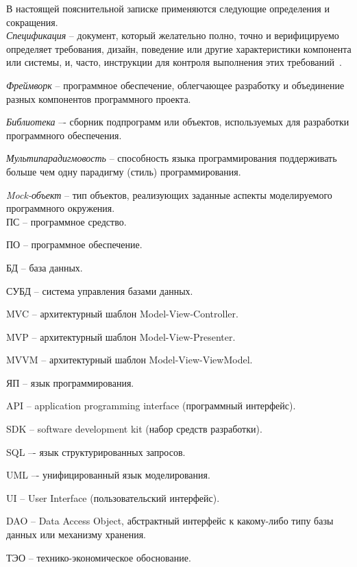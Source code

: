 \label{sec:definitions}

В настоящей пояснительной записке применяются следующие определения и сокращения.
\\

\emph{Спецификация} -- документ, который желательно полно, точно и верифицируемо определяет требования, дизайн, поведение или другие характеристики компонента или системы, и, часто, инструкции для контроля выполнения этих требований~\cite{istqb_specification}.

\emph{Фреймворк} -- программное обеспечение, облегчающее разработку и объединение разных компонентов программного проекта.

\emph{Библиотека} –- сборник подпрограмм или объектов, используемых для разработки программного обеспечения.

\emph{Мультипарадигмовость} -- способность языка программирования поддерживать больше чем одну парадигму (стиль) программирования.

\emph{Mock-объект} -- тип объектов, реализующих заданные аспекты моделируемого программного окружения.
\\

ПС -- программное средство.

ПО -- программное обеспечение.

БД -- база данных.

СУБД -- система управления базами данных.

MVC -- архитектурный шаблон Model-View-Controller.

MVP -- архитектурный шаблон Model-View-Presenter.

MVVM -- архитектурный шаблон Model-View-ViewModel.

ЯП -- язык программирования.

API -- application programming interface (программный интерфейс).

SDK -- software development kit (набор средств разработки).

SQL –- язык структурированных запросов.

UML –- унифицированный язык моделирования.

UI -- User Interface (пользовательский интерфейс).

DAO -- Data Access Object, абстрактный интерфейс к какому-либо типу базы данных или механизму хранения.

ТЭО -- технико-экономическое обоснование.
